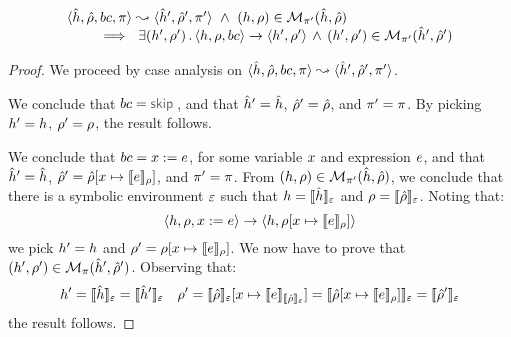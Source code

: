 \begin{lemma}
$$
\begin{array}{l}
\symbtrans{\sheap, \sstore, \bcmd, \pc}{\sheap', \sstore', \pc'}
   \ \wedge \ 
      (\heap, \store) \in \smodels{\sheap, \sstore}{\pc'} \\ \quad \quad
      	 \ \implies \ \exists (\heap', \store') \, . \, 
	 	 \semtrans{\heap, \store, \bcmd}{\heap', \store'}
		\, \wedge \, 
		(\heap', \store') \in \smodels{\sheap', \sstore'}{\pc'}  
\end{array}
$$
\end{lemma}
\begin{proof}
We proceed by case analysis on $\symbtrans{\sheap, \sstore, \bcmd, \pc}{\sheap', \sstore', \pc'}$. 
\vspace{5pt}

\noindent{} 
We conclude that $\bcmd = \jsilskip$, and 
that $\sheap' = \sheap$, $\sstore' = \sstore$, and $\pc' = \pc$. 
By picking $\heap' = \heap$, $\store' = \store$, the result follows. 
\vspace{6pt}

\noindent{} 
We conclude that $\bcmd = \jvar := \jsilexpr$, for some variable $\jvar$ and expression $\jsilexpr$, 
and that $\sheap' = \sheap$, $\sstore' = \sstore[\jvar \mapsto \symbeval{\jsilexpr}{\store}]$, and $\pc' = \pc$. 
From $(\heap, \store) \in \smodels{\sheap, \sstore}{\pc'}$, we conclude that there is a symbolic environment 
$\senv$ such that $\heap = \semexpr{\sheap}{\senv}$ and $\store = \semexpr{\sstore}{\senv}$. 
Noting that: 
$$
 \semtrans{\heap, \store, \jvar := \jsilexpr}{\heap, \store[\jvar \mapsto \symbeval{\jsilexpr}{\store}]}
$$
we pick $\heap' = \heap$ and $\store' =  \store[\jvar \mapsto \symbeval{\jsilexpr}{\store}]$. We 
now have to prove that $(\heap', \store') \in \smodels{\sheap', \sstore'}{\pc}$.
Observing that: 
$$
\heap' =  \semexpr{\sheap}{\senv} = \semexpr{\sheap'}{\senv} 
\quad 
\store' = \semexpr{\sstore}{\senv}[\jvar \mapsto \symbeval{\jsilexpr}{\semexpr{\sstore}{\senv}}]
   = \semexpr{\sstore[\jvar \mapsto \symbeval{\jsilexpr}{\store}]}{\senv} 
   = \semexpr{\sstore'}{\senv}
$$
%
the result follows. 
\vspace{6pt}


\end{proof}
